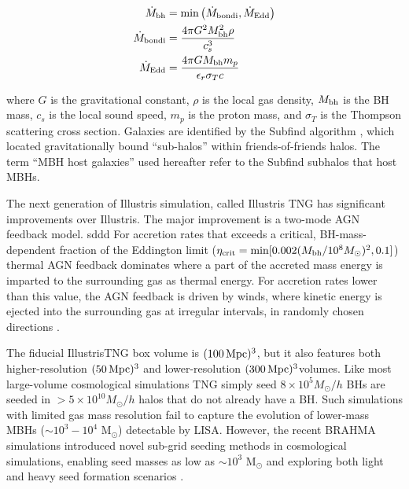\documentclass[11pt, letterpaper]{article}
\newcommand{\msun}{M$_{\odot}$}
\begin{document}
\begin{align}
    \dot{M}_{\rm bh} &= \min \left( \dot{M}_{\rm bondi}, \dot{M}_{\rm Edd} \right) \\
    \dot{M}_{\rm bondi} &= \frac{4 \pi G^2 M^2_{\rm bh} \rho }{c^3_s}\\
    \dot{M}_{\rm Edd} &= \frac{4 \pi G M_{\rm bh} m_p }{\epsilon_r \sigma_T c}
\end{align}

where $G$ is the gravitational constant, $\rho$ is the local gas density, $M_{\rm bh}$ is the BH mass, $c_s$ is the local sound speed, $m_p$ is the proton mass, and $\sigma_T$ is the Thompson scattering cross section. Galaxies are identified by the Subfind algorithm \citep{Dolag_2009}, which located gravitationally bound “sub-halos” within friends-of-friends halos. The term “MBH host galaxies” used hereafter refer to the Subfind subhalos that host MBHs.

The next generation of Illustris simulation, called Illustris TNG has significant improvements over Illustris. The major improvement is a two-mode AGN feedback model.  sddd  For accretion rates that exceeds a critical, BH-mass-dependent fraction of the Eddington limit ($\eta_{\rm crit} = \min[0.002 (M_{\rm bh}/10^8 M_{\odot})^2,  0.1]$) thermal AGN feedback dominates where a part of the accreted mass energy is imparted to the surrounding gas as thermal energy. For accretion rates lower than this value, the AGN feedback is driven by winds, where kinetic energy is ejected into the surrounding gas at irregular intervals, in randomly chosen directions \citep{Weinberger_2016}. 

The fiducial IllustrisTNG box volume is $(100 \, \rm Mpc)^3$,
but it also features both higher-resolution $(50 \, \rm Mpc)^3$
and lower-resolution $(300 \, \rm Mpc)^3$volumes. Like most large-volume cosmological simulations TNG simply seed $8 \times 10^{5} M_{\odot}/h$ BHs are seeded in $ > 5 \times 10^{10} M_{\odot}/h$
halos that do not already have a BH. Such simulations with limited gas mass resolution fail to capture the evolution of lower-mass MBHs ($\sim 10^3 - 10^4$ \msun{}) detectable by LISA. However, the recent BRAHMA simulations introduced novel sub-grid seeding methods in cosmological simulations, enabling seed masses as low as $\sim 10^3$ \msun{} and exploring both light and heavy seed formation scenarios \citep{bhowmick2023representinglowmassblack,bhowmick2024introducingbrahmasimulationsuite,bhowmick2024growthhighredshiftsupermassive,bhowmick2024signaturesblackholeseeding}. 
\end{document}
